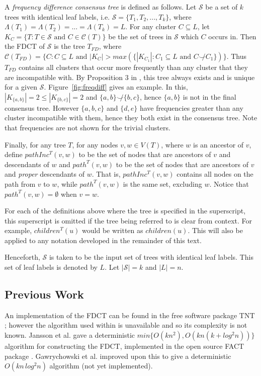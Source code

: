 \documentclass{article}
\newcommand{\compatible}{\smile}
\newcommand{\leafset}{\Lambda}
\begin{document}
    A \textit{frequency difference consensus tree} is defined as follows. Let $\mathcal{S}$ be a set of $k$ trees with identical leaf labels, i.e. $\mathcal{S} = \{T_1, T_2, ..., T_k\}$, where $\leafset(T_1) = \leafset(T_2) = ... = \leafset(T_k) = L$. For any cluster $C \subseteq L$, let $K_C = \{T : T \in \mathcal{S} \text{ and } C \in \mathcal{C}(T)\}$ be the set of trees in $\mathcal{S}$ which $C$ occurs in. Then the FDCT of $\mathcal{S}$ is the tree $T_{FD}$, where $\mathcal{C}(T_{FD}) = \{C : C \subseteq L \text{ and } |K_C| > max(\{|K_{C_1}| : C_1 \subseteq L \text{ and } C \not\compatible C_1\})\}$. Thus $T_{FD}$ contains all clusters that occur more frequently than any cluster that they are incompatible with. By Proposition $3$ in \cite{steel2014axiomatic}, this tree always exists and is unique for a given $\mathcal{S}$. Figure~\ref{fig:freqdiff} gives an example. In this, $|K_{\{a, b\}}| = 2 \leq |K_{\{b, c\}}| = 2$ and $\{a, b\} \not\compatible \{b, c\}$, hence $\{a, b\}$ is not in the final consensus tree. However $\{a, b, c\}$ and $\{d, e\}$ have frequencies greater than any cluster incompatible with them, hence they both exist in the consensus tree. Note that frequencies are not shown for the trivial clusters.

    Finally, for any tree $T$, for any nodes $v, w \in V(T)$, where $w$ is an ancestor of $v$, define $pathInc^{T}(v, w)$ to be the set of nodes that are ancestors of $v$ and descendants of $w$ and $path^{T}(v, w)$ to be the set of nodes that are ancestors of $v$ and \textit{proper} descendants of $w$. That is, $pathInc^{T}(v, w)$ contains all nodes on the path from $v$ to $w$, while $path^{T}(v, w)$ is the same set, excluding $w$. Notice that $path^{T}(v, w) = \emptyset$ when $v = w$.

    For each of the definitions above where the tree is specified in the superscript, this superscript is omitted if the tree being referred to is clear from context. For example, $children^T(u)$ would be written as $children(u)$. This will also be applied to any notation developed in the remainder of this text.

    Henceforth, $\mathcal{S}$ is taken to be the input set of trees with identical leaf labels. This set of leaf labels is denoted by $L$. Let $|\mathcal{S}| = k$ and $|L| = n$.

    \subsection{Previous Work}
    An implementation of the FDCT can be found in the free software package TNT \cite{goloboff2008tnt}; however the algorithm used within is unavailable and so its complexity is not known. Jansson et al. \cite{jansson2018algorithms} gave a deterministic $min\{O(kn^2), O(kn(k + log^2 n))\}$ algorithm for constructing the FDCT, implemented in the open source FACT package \cite{jansson2016improved}. Gawrychowski et al. \cite{gawrychowski2017faster} improved upon this to give a deterministic $O(kn\,log^2n)$ algorithm (not yet implemented).
\end{document}
